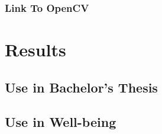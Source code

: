 \documentclass[hidelinks,11pt,a4paper,oneside,article]{memoir}
\begin{document}
    \subsection{Link To OpenCV}
    
    \clearpage
	\chapter{Results}
    \section{Use in Bachelor's Thesis}
    \section{Use in Well-being}
	
	
	
	
	
	\clearpage
	\begin{flushleft}
		\begin{singlespacing}
			
		\end{singlespacing}
	\end{flushleft}
	
	\label{LastPage}~
	
	
	\clearpage
	\appendix
	\addappheadtotoc
	\renewcommand{\thechapter}{\arabic{chapter}} 
	
\end{document}
